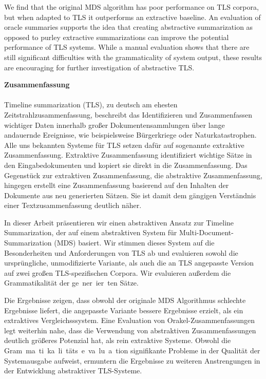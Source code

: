 \documentclass[a4paper,BCOR=10mm]{report}
\numberwithin{lemma}{chapter}
\numberwithin{definition}{chapter}
\begin{document}
\begin{titlepage}
We find that the original MDS algorithm has poor performance on TLS corpora, but when adapted to TLS it outperforms an extractive baseline.
An evaluation of oracle summaries supports the idea that creating abstractive summarization as opposed to purley extractive summarizations can improve the potential performance of TLS systems.
While a manual evaluation shows that there are still significant difficulties with the grammaticality of system output, these results are encouraging for further investigation of abstractive TLS.

\newpage
\noindent
\large\textbf{Zusammenfassung}\\
\\

Timeline summarization (TLS), zu deutsch am ehesten Zeitstrahlzusammenfassung, beschreibt das Identifizieren und Zusammenfassen wichtiger Daten innerhalb großer Dokumentensammlungen über lange andauernde Ereignisse, wie beispielsweise Bürgerkriege oder Naturkatastrophen.
Alle uns bekannten Systeme für TLS setzen dafür auf sogenannte extraktive Zusammenfassung. Extraktive Zusammenfassung identifiziert wichtige Sätze in den Eingabedokumenten und kopiert sie direkt in die Zusammenfassung. Das Gegenstück zur extraktiven Zusammenfassung, die abstraktive Zusammenfassung, hingegen erstellt eine Zusammenfassung basierend auf den Inhalten der Dokumente aus neu generierten Sätzen. Sie ist damit dem gängigen Verständnis einer Textzusammenfassung deutlich näher.

In dieser Arbeit präsentieren wir einen abstraktiven Ansatz zur Timeline Summarization, der auf einem abstraktiven System für Multi-Document-Summarization (MDS) basiert. Wir stimmen dieses System auf die Besonderheiten und Anforderungen von TLS ab und evaluieren sowohl die ursprüngliche, unmodifizierte Variante, als auch die an TLS angepasste Version auf zwei großen TLS-spezifischen Corpora.
Wir evaluieren außerdem die Grammatikalität der ge~ner~ier~ten Sätze.

Die Ergebnisse zeigen, dass obwohl der originale MDS Algorithmus schlechte Ergebnisse liefert, die angepasste Variante bessere Ergebnisse erzielt, als ein extraktives Vergleichsssystem.
Eine Evaluation von Orakel-Zusammenfassungen legt weiterhin nahe, dass die Verwendung von abstraktiven Zusammenfassungen deutlich größeres Potenzial hat, als rein extraktive Systeme.
Obwohl die Gram~ma~ti~ka~li~täts~e~va~lu~a~tion signifikante Probleme in der Qualität der Systemausgabe aufweist, ermuntern die Ergebnisse zu weiteren Anstrengungen in der Entwicklung abstraktiver TLS-Systeme. 

\newpage
\normalsize
\tableofcontents

\end{titlepage}
\end{document}
